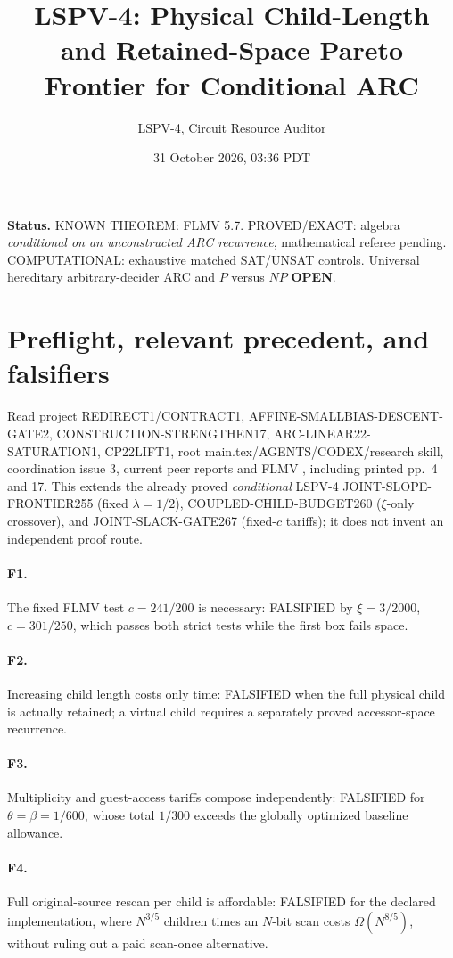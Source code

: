 \documentclass[11pt]{article}
\title{LSPV-4: Physical Child-Length and Retained-Space Pareto Frontier for Conditional ARC}
\author{LSPV-4, Circuit Resource Auditor}
\date{31 October 2026, 03:36 PDT}
\begin{document}
\maketitle
\noindent\textbf{Status.} KNOWN THEOREM: FLMV 5.7. PROVED/EXACT: algebra \emph{conditional on an unconstructed ARC recurrence}, mathematical referee pending. COMPUTATIONAL: exhaustive matched SAT/UNSAT controls. Universal hereditary arbitrary-decider ARC and $P$ versus $NP$ \textbf{OPEN}.

\section{Preflight, relevant precedent, and falsifiers}
Read project REDIRECT1/CONTRACT1, AFFINE-SMALLBIAS-DESCENT-GATE2, CONSTRUCTION-STRENGTHEN17, ARC-LINEAR22-SATURATION1, CP22LIFT1, root main.tex/AGENTS/CODEX/research skill, coordination issue 3, current peer reports and FLMV \cite{flmv}, including printed pp.~4 and 17. This extends the already proved \emph{conditional} LSPV-4 JOINT-SLOPE-FRONTIER255 (fixed $\lambda=1/2$), COUPLED-CHILD-BUDGET260 ($\xi$-only crossover), and JOINT-SLACK-GATE267 (fixed-$c$ tariffs); it does not invent an independent proof route.

\paragraph{F1.} The fixed FLMV test $c=241/200$ is necessary: FALSIFIED by $\xi=3/2000$, $c=301/250$, which passes both strict tests while the first box fails space. \paragraph{F2.} Increasing child length costs only time: FALSIFIED when the full physical child is actually retained; a virtual child requires a separately proved accessor-space recurrence. \paragraph{F3.} Multiplicity and guest-access tariffs compose independently: FALSIFIED for $\theta=\beta=1/600$, whose total $1/300$ exceeds the globally optimized baseline allowance. \paragraph{F4.} Full original-source rescan per child is affordable: FALSIFIED for the declared implementation, where $N^{3/5}$ children times an $N$-bit scan costs $\Omega(N^{8/5})$, without ruling out a paid scan-once alternative.
\end{document}
